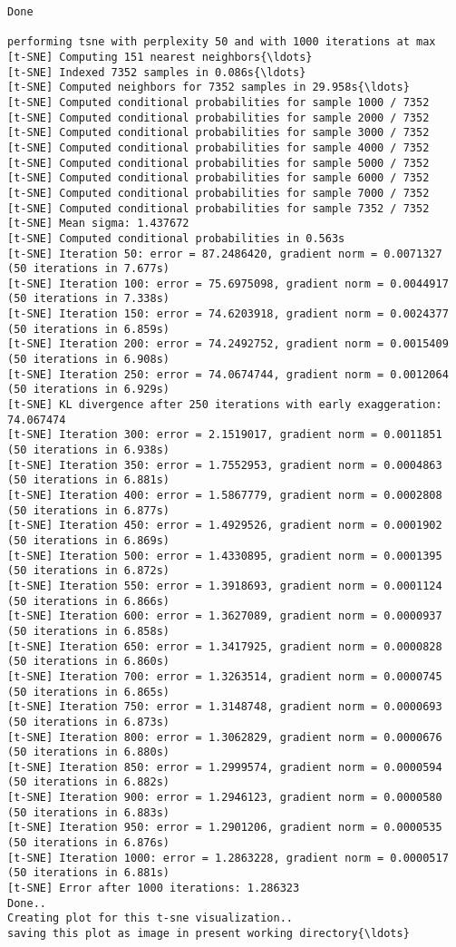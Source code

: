 \documentclass[11pt]{article}
\begin{document}
    \begin{Verbatim}[commandchars=\\\{\}]
Done

performing tsne with perplexity 50 and with 1000 iterations at max
[t-SNE] Computing 151 nearest neighbors{\ldots}
[t-SNE] Indexed 7352 samples in 0.086s{\ldots}
[t-SNE] Computed neighbors for 7352 samples in 29.958s{\ldots}
[t-SNE] Computed conditional probabilities for sample 1000 / 7352
[t-SNE] Computed conditional probabilities for sample 2000 / 7352
[t-SNE] Computed conditional probabilities for sample 3000 / 7352
[t-SNE] Computed conditional probabilities for sample 4000 / 7352
[t-SNE] Computed conditional probabilities for sample 5000 / 7352
[t-SNE] Computed conditional probabilities for sample 6000 / 7352
[t-SNE] Computed conditional probabilities for sample 7000 / 7352
[t-SNE] Computed conditional probabilities for sample 7352 / 7352
[t-SNE] Mean sigma: 1.437672
[t-SNE] Computed conditional probabilities in 0.563s
[t-SNE] Iteration 50: error = 87.2486420, gradient norm = 0.0071327 (50 iterations in 7.677s)
[t-SNE] Iteration 100: error = 75.6975098, gradient norm = 0.0044917 (50 iterations in 7.338s)
[t-SNE] Iteration 150: error = 74.6203918, gradient norm = 0.0024377 (50 iterations in 6.859s)
[t-SNE] Iteration 200: error = 74.2492752, gradient norm = 0.0015409 (50 iterations in 6.908s)
[t-SNE] Iteration 250: error = 74.0674744, gradient norm = 0.0012064 (50 iterations in 6.929s)
[t-SNE] KL divergence after 250 iterations with early exaggeration: 74.067474
[t-SNE] Iteration 300: error = 2.1519017, gradient norm = 0.0011851 (50 iterations in 6.938s)
[t-SNE] Iteration 350: error = 1.7552953, gradient norm = 0.0004863 (50 iterations in 6.881s)
[t-SNE] Iteration 400: error = 1.5867779, gradient norm = 0.0002808 (50 iterations in 6.877s)
[t-SNE] Iteration 450: error = 1.4929526, gradient norm = 0.0001902 (50 iterations in 6.869s)
[t-SNE] Iteration 500: error = 1.4330895, gradient norm = 0.0001395 (50 iterations in 6.872s)
[t-SNE] Iteration 550: error = 1.3918693, gradient norm = 0.0001124 (50 iterations in 6.866s)
[t-SNE] Iteration 600: error = 1.3627089, gradient norm = 0.0000937 (50 iterations in 6.858s)
[t-SNE] Iteration 650: error = 1.3417925, gradient norm = 0.0000828 (50 iterations in 6.860s)
[t-SNE] Iteration 700: error = 1.3263514, gradient norm = 0.0000745 (50 iterations in 6.865s)
[t-SNE] Iteration 750: error = 1.3148748, gradient norm = 0.0000693 (50 iterations in 6.873s)
[t-SNE] Iteration 800: error = 1.3062829, gradient norm = 0.0000676 (50 iterations in 6.880s)
[t-SNE] Iteration 850: error = 1.2999574, gradient norm = 0.0000594 (50 iterations in 6.882s)
[t-SNE] Iteration 900: error = 1.2946123, gradient norm = 0.0000580 (50 iterations in 6.883s)
[t-SNE] Iteration 950: error = 1.2901206, gradient norm = 0.0000535 (50 iterations in 6.876s)
[t-SNE] Iteration 1000: error = 1.2863228, gradient norm = 0.0000517 (50 iterations in 6.881s)
[t-SNE] Error after 1000 iterations: 1.286323
Done..
Creating plot for this t-sne visualization..
saving this plot as image in present working directory{\ldots}

    \end{Verbatim}
\end{document}
